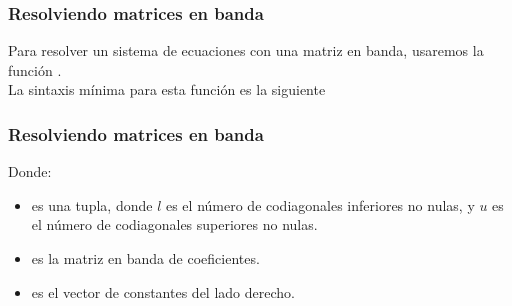 \begin{frame}[fragile]
\frametitle{Resolviendo matrices en banda}
Para resolver un sistema de ecuaciones con una matriz en banda, usaremos la función .
\\
\bigskip
\pause
La sintaxis mínima para esta función es la siguiente
\begin{alltt}
\end{alltt}
\end{frame}
\begin{frame}[fragile]
\frametitle{Resolviendo matrices en banda}
\begin{alltt}
\end{alltt}
Donde:
\begin{itemize}[<+->]
\item {} es una tupla, donde $l$ es el número de codiagonales inferiores no nulas, y $u$ es el número de codiagonales superiores no nulas.
\item {} es la matriz en banda de coeficientes.
\item {} es el vector de constantes del lado derecho.
\end{itemize}
\end{frame}
